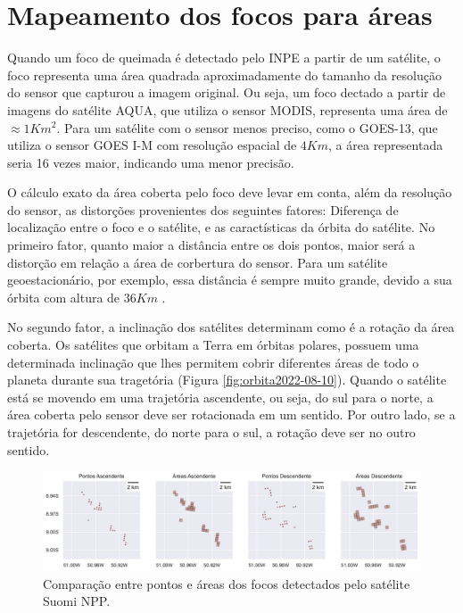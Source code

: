 \documentclass[cic,tc]{iiufrgs}
\begin{document}
\section{Mapeamento dos focos para áreas}

Quando um foco de queimada é detectado pelo INPE a partir de um satélite, o foco representa uma área quadrada aproximadamente do tamanho da resolução do sensor que capturou a imagem original. Ou seja, um foco dectado a partir de imagens do satélite AQUA, que utiliza o sensor MODIS, representa uma área de $\approx1Km^2$. Para um satélite com o sensor menos preciso, como o GOES-13, que utiliza o sensor GOES I-M com resolução espacial de $4Km$, a área representada seria 16 vezes maior, indicando uma menor precisão. \par

O cálculo exato da área coberta pelo foco deve levar em conta, além da resolução do sensor, as distorções provenientes dos seguintes fatores: Diferença de localização entre o foco e o satélite, e as caractísticas da órbita do satélite. No primeiro fator, quanto maior a distância entre os dois pontos, maior será a distorção em relação a área de corbertura do sensor. Para um satélite geoestacionário, por exemplo, essa distância é sempre muito grande, devido a sua órbita com altura de $36Km$ \citep{EmbrapaSatelites}. \par

No segundo fator, a inclinação dos satélites determinam como é a rotação da área coberta. Os satélites que orbitam a Terra em órbitas polares, possuem uma determinada inclinação que lhes permitem cobrir diferentes áreas de todo o planeta durante sua tragetória (Figura \ref{fig:orbita2022-08-10}). Quando o satélite está se movendo em uma trajetória ascendente, ou seja, do sul para o norte, a área coberta pelo sensor deve ser rotacionada em um sentido. Por outro lado, se a trajetória for descendente, do norte para o sul, a rotação deve ser no outro sentido. \par

\begin{figure}[H]
    \caption{Comparação entre pontos e áreas dos focos detectados pelo satélite Suomi NPP.}
    \begin{center}
        \includegraphics[width=35em]{comparacao_pontos_e_areas}
    \end{center}
    \label{fig:comparacao_pontos_e_areas}
\end{figure}
\end{document}
